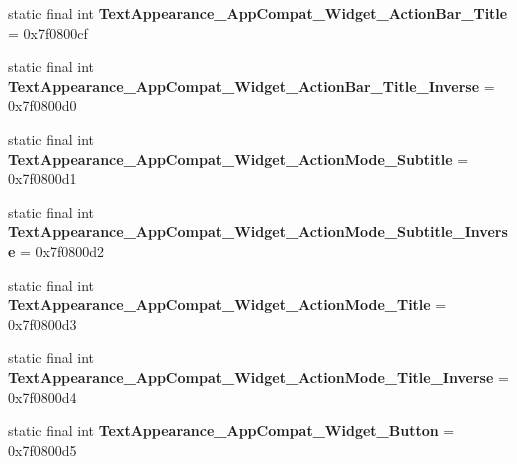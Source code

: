 \begin{DoxyCompactItemize}
\item 
\hypertarget{classandroid_1_1support_1_1design_1_1_r_1_1style_aaaab7e3d3971a6f10bb562b456a880ce}{}static final int {\bfseries Text\+Appearance\+\_\+\+App\+Compat\+\_\+\+Widget\+\_\+\+Action\+Bar\+\_\+\+Title} = 0x7f0800cf\label{classandroid_1_1support_1_1design_1_1_r_1_1style_aaaab7e3d3971a6f10bb562b456a880ce}

\item 
\hypertarget{classandroid_1_1support_1_1design_1_1_r_1_1style_a2722bf365f89efd965c2db9d167ded91}{}static final int {\bfseries Text\+Appearance\+\_\+\+App\+Compat\+\_\+\+Widget\+\_\+\+Action\+Bar\+\_\+\+Title\+\_\+\+Inverse} = 0x7f0800d0\label{classandroid_1_1support_1_1design_1_1_r_1_1style_a2722bf365f89efd965c2db9d167ded91}

\item 
\hypertarget{classandroid_1_1support_1_1design_1_1_r_1_1style_a88f869ee4fba3220eafc9e864ca53331}{}static final int {\bfseries Text\+Appearance\+\_\+\+App\+Compat\+\_\+\+Widget\+\_\+\+Action\+Mode\+\_\+\+Subtitle} = 0x7f0800d1\label{classandroid_1_1support_1_1design_1_1_r_1_1style_a88f869ee4fba3220eafc9e864ca53331}

\item 
\hypertarget{classandroid_1_1support_1_1design_1_1_r_1_1style_a327b34a8b3d0970314966a1afc1fbad0}{}static final int {\bfseries Text\+Appearance\+\_\+\+App\+Compat\+\_\+\+Widget\+\_\+\+Action\+Mode\+\_\+\+Subtitle\+\_\+\+Inverse} = 0x7f0800d2\label{classandroid_1_1support_1_1design_1_1_r_1_1style_a327b34a8b3d0970314966a1afc1fbad0}

\item 
\hypertarget{classandroid_1_1support_1_1design_1_1_r_1_1style_a76c4a04f6f0f71fecc0e75b34c0aa6a0}{}static final int {\bfseries Text\+Appearance\+\_\+\+App\+Compat\+\_\+\+Widget\+\_\+\+Action\+Mode\+\_\+\+Title} = 0x7f0800d3\label{classandroid_1_1support_1_1design_1_1_r_1_1style_a76c4a04f6f0f71fecc0e75b34c0aa6a0}

\item 
\hypertarget{classandroid_1_1support_1_1design_1_1_r_1_1style_aad2554eae3444b77e7be2d9754c380f8}{}static final int {\bfseries Text\+Appearance\+\_\+\+App\+Compat\+\_\+\+Widget\+\_\+\+Action\+Mode\+\_\+\+Title\+\_\+\+Inverse} = 0x7f0800d4\label{classandroid_1_1support_1_1design_1_1_r_1_1style_aad2554eae3444b77e7be2d9754c380f8}

\item 
\hypertarget{classandroid_1_1support_1_1design_1_1_r_1_1style_a5af41ce514978fd38404e848b723b5ae}{}static final int {\bfseries Text\+Appearance\+\_\+\+App\+Compat\+\_\+\+Widget\+\_\+\+Button} = 0x7f0800d5\label{classandroid_1_1support_1_1design_1_1_r_1_1style_a5af41ce514978fd38404e848b723b5ae}


\end{DoxyCompactItemize}
